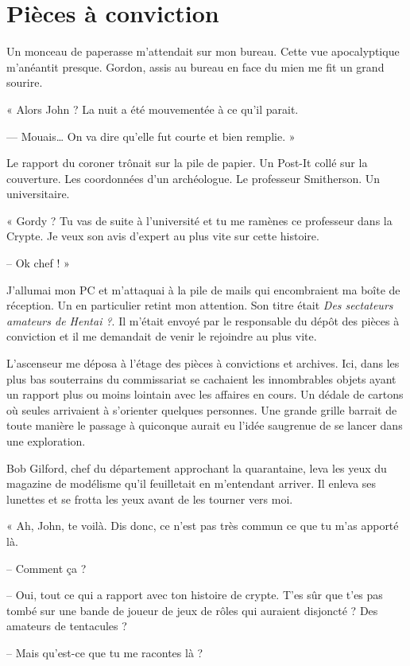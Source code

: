 \chapter[Pièces à conviction]{Pièces à conviction}
Un monceau de paperasse m'attendait sur mon bureau. Cette vue apocalyptique m'anéantit presque. Gordon, assis au bureau  
en face du mien me fit un grand sourire.

« Alors John ? La nuit a été mouvementée à ce qu'il parait.

— Mouais… On va dire qu'elle fut courte et bien remplie. »

Le rapport du coroner trônait sur la pile de papier. Un Post-It collé sur la couverture. Les coordonnées d'un
archéologue. Le professeur Smitherson. Un universitaire.

« Gordy ? Tu vas de suite à l'université et tu me ramènes ce professeur dans la Crypte. Je veux son avis d'expert au plus
vite sur cette histoire.

-- Ok chef ! »

J'allumai mon PC et m'attaquai à la pile de mails qui encombraient ma boîte de réception. Un en particulier retint mon
attention. Son titre était \emph{Des sectateurs amateurs de Hentai ?}. Il m'était envoyé par le responsable du dépôt des 
pièces à conviction et il me demandait de venir le rejoindre au plus vite.

L'ascenseur me déposa à l'étage des pièces à convictions et archives. Ici, dans les plus bas souterrains du commissariat se
cachaient les innombrables objets ayant un rapport plus ou moins lointain avec les affaires en cours. Un dédale de
cartons où seules arrivaient à s'orienter quelques personnes. Une grande grille barrait de toute manière le passage à
quiconque aurait eu l'idée saugrenue de se lancer dans une exploration.

Bob Gilford, chef du département approchant la quarantaine, leva les yeux du magazine de modélisme qu'il feuilletait en 
m'entendant arriver. Il enleva ses lunettes et se frotta les yeux avant de les tourner vers moi.

« Ah, John, te voilà. Dis donc, ce n'est pas très commun ce que tu m'as apporté là.

-- Comment ça ?

-- Oui, tout ce qui a rapport avec ton histoire de crypte. T'es sûr que t'es pas tombé sur une bande de joueur de jeux
de rôles qui auraient disjoncté ? Des amateurs de tentacules ?

-- Mais qu'est-ce que tu me racontes là ?

